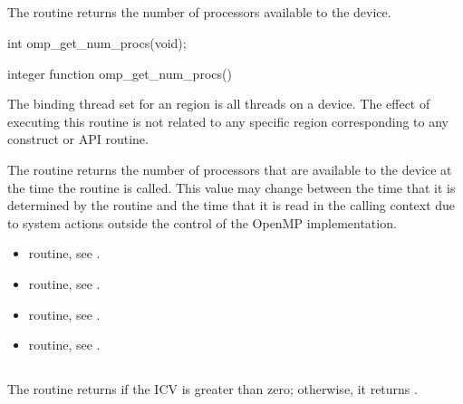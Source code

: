 \subsection{}
\label{subsec:omp_get_num_procs}
\summary
The  routine returns the number of processors 
available to the device.

\format
\begin{ccppspecific}
\begin{ompcFunction}
int omp_get_num_procs(void);
\end{ompcFunction}
\end{ccppspecific}

\begin{fortranspecific}
\begin{ompfFunction}
integer function omp_get_num_procs()
\end{ompfFunction}
\end{fortranspecific}

\binding
The binding thread set for an  region is all 
threads on a device. The effect of executing this routine is not related 
to any specific region corresponding to any construct or API routine.

\effect
The  routine returns the number of processors 
that are available to the device at the time the routine is called. 
This value may change between the time that it is determined by the 
 routine and the time that it is read in the 
calling context due to system actions outside the control of the OpenMP
implementation.

\crossreferences
\begin{itemize}
\item {} routine, see
.

\item {} routine, see
.

\item {} routine, see
.

\item {} routine, see
.
\end{itemize}



\subsection{}
\label{subsec:omp_in_parallel}
\summary
The  routine returns  if the 
 ICV is greater than zero; otherwise, 
it returns .

